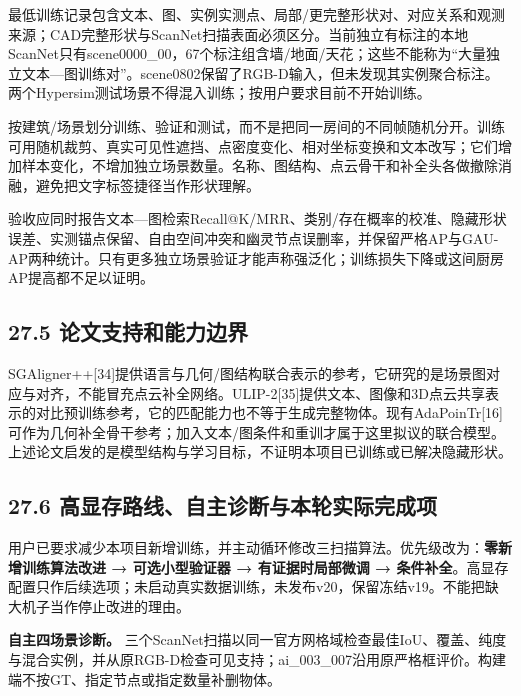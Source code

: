 \documentclass[UTF8,fontset=fandol]{ctexart}
\begin{document}
最低训练记录包含文本、图、实例实测点、局部/更完整形状对、对应关系和观测来源；CAD完整形状与ScanNet扫描表面必须区分。当前独立有标注的本地ScanNet只有scene0000\_00，67个标注组含墙/地面/天花；这些不能称为“大量独立文本—图训练对”。scene0802保留了RGB-D输入，但未发现其实例聚合标注。两个Hypersim测试场景不得混入训练；按用户要求目前不开始训练。



按建筑/场景划分训练、验证和测试，而不是把同一房间的不同帧随机分开。训练可用随机裁剪、真实可见性遮挡、点密度变化、相对坐标变换和文本改写；它们增加样本变化，不增加独立场景数量。名称、图结构、点云骨干和补全头各做撤除消融，避免把文字标签捷径当作形状理解。



验收应同时报告文本—图检索Recall@K/MRR、类别/存在概率的校准、隐藏形状误差、实测锚点保留、自由空间冲突和幽灵节点误删率，并保留严格AP与GAU-AP两种统计。只有更多独立场景验证才能声称强泛化；训练损失下降或这间厨房AP提高都不足以证明。



\subsection*{27.5 论文支持和能力边界}

SGAligner++[34]提供语言与几何/图结构联合表示的参考，它研究的是场景图对应与对齐，不能冒充点云补全网络。ULIP-2[35]提供文本、图像和3D点云共享表示的对比预训练参考，它的匹配能力也不等于生成完整物体。现有AdaPoinTr[16]可作为几何补全骨干参考；加入文本/图条件和重训才属于这里拟议的联合模型。上述论文启发的是模型结构与学习目标，不证明本项目已训练或已解决隐藏形状。



\subsection*{27.6 高显存路线、自主诊断与本轮实际完成项}

用户已要求减少本项目新增训练，并主动循环修改三扫描算法。优先级改为：\textbf{零新增训练算法改进 → 可选小型验证器 → 有证据时局部微调 → 条件补全}。高显存配置只作后续选项；未启动真实数据训练，未发布v20，保留冻结v19。不能把缺大机子当作停止改进的理由。



\textbf{自主四场景诊断。} 三个ScanNet扫描以同一官方网格域检查最佳IoU、覆盖、纯度与混合实例，并从原RGB-D检查可见支持；ai\_003\_007沿用原严格框评价。构建端不按GT、指定节点或指定数量补删物体。
\end{document}
